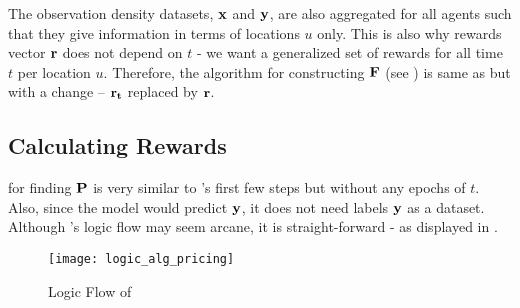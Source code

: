 The observation density datasets, $\mathbf{x}$ and $\mathbf{y}$, are also aggregated for all agents such that they give information in terms of locations $u$ only. This is also why rewards vector $\mathbf{r}$ does not depend on $t$ - we want a generalized set of rewards for all time $t$ per location $u$. Therefore, the algorithm for constructing $\mathbf{F}$ (see ) is same as  but with a change -- $\mathbf{r_t}$ replaced by $\mathbf{r}$.

\subsection{Calculating Rewards} \label{sec:Calculating Rewards}
 for finding $\mathbf{P}$ is very similar to 's first few steps but without any epochs of $t$. Also, since the model would predict $\mathbf{y}$, it does not need labels $\mathbf{y}$ as a dataset. Although 's logic flow may seem arcane, it is straight-forward - as displayed in .
\begin{figure}[!htbp]
    \centering
    \texttt{[image: logic\_alg\_pricing]}
    \caption{Logic Flow of }
    \label{fig:Logic Flow of Algorithm Pricing Problem}
\end{figure}
